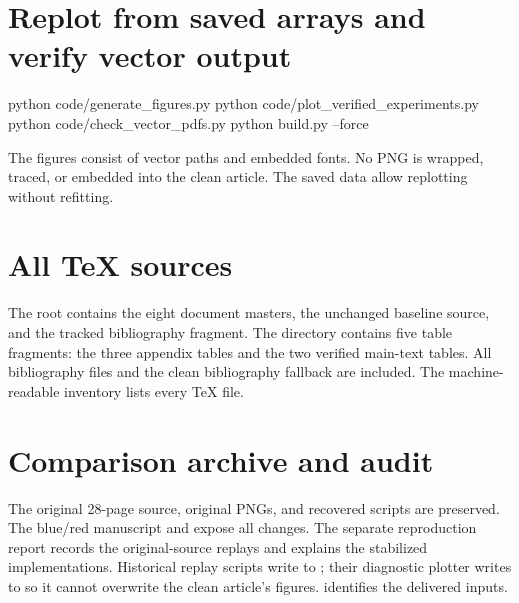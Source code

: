 \documentclass[11pt,a4paper]{article}
\begin{document}
\section*{Replot from saved arrays and verify vector output}
\begin{Commands}
python code/generate_figures.py
python code/plot_verified_experiments.py
python code/check_vector_pdfs.py
python build.py --force
\end{Commands}
The figures consist of vector paths and embedded fonts. No PNG is wrapped, traced, or embedded into the clean article. The saved data allow replotting without refitting.

\section*{All TeX sources}
The root contains the eight document masters, the unchanged baseline source, and the tracked bibliography fragment. The  directory contains five table fragments: the three appendix tables and the two verified main-text tables. All bibliography files and the clean bibliography fallback are included. The machine-readable inventory  lists every TeX file.

\section*{Comparison archive and audit}
The original 28-page source, original PNGs, and recovered scripts are preserved. The blue/red manuscript and  expose all changes. The separate reproduction report records the original-source replays and explains the stabilized implementations. Historical replay scripts write to ; their diagnostic plotter writes to  so it cannot overwrite the clean article's figures.  identifies the delivered inputs.
\end{document}

